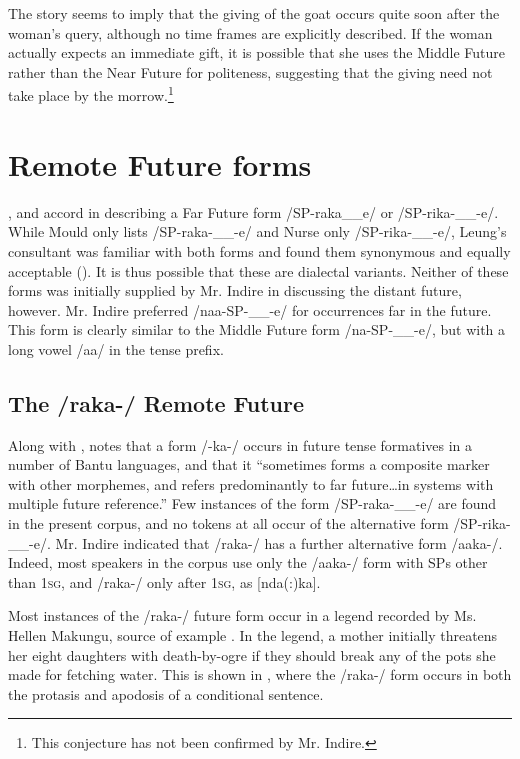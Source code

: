 \documentclass[output=paper]{langsci/langscibook}
\begin{document}
The story seems to imply that the giving of the goat occurs quite soon after the woman’s query, although no time frames are explicitly described. If the woman actually expects an immediate gift, it is possible that she uses the Middle Future rather than the Near Future for politeness, suggesting that the giving need not take place by the morrow.\footnote{ This conjecture has not been confirmed by Mr. Indire.}

\section[Remote Future forms]{Remote Future forms} \label{sec:sarvasy:6}
\citet{Mould1981}, \citet{Leung1991} and \citet{Nurse2003} accord in describing a Far Future %
%
form /SP-raka\_\_e/ or /SP-rika-\_\_-e/. While Mould only lists /SP-raka-\_\_-e/ and Nurse only /SP-rika-\_\_-e/, Leung’s consultant was familiar with both forms and found them synonymous and equally acceptable (\citeyear[204, fn 10]{Leung1991}). It is thus possible that these are dialectal variants. Neither of these forms was initially supplied by Mr. Indire in discussing the distant future, however. Mr. Indire preferred /naa-SP-\_\_-e/ for occurrences far in the future. This form is clearly similar to the Middle Future form /na-SP-\_\_-e/, but with a long vowel /aa/ in the tense prefix. 

\subsection{The /raka-/ Remote Future}\label{sec:sarvasy:6.1}

Along with \citet{Botne1999}, \citet[85]{Nurse2008} notes that a form /-ka-/ occurs in future tense formatives in a number of Bantu languages, and that it “sometimes forms a composite marker with other morphemes, and refers predominantly to far future\ldots in systems with multiple future reference.” Few instances of the form /SP-raka-\_\_-e/ are found in the present corpus, and no tokens at all occur of the alternative form /SP-rika-\_\_-e/. Mr. Indire indicated that /raka-/ has a further alternative form /aaka-/. Indeed, most speakers in the corpus use only the /aaka-/ form with SPs other than \textsc{1sg}, and /raka-/ only after \textsc{1sg}, as [nda(:)ka].

Most instances of the /raka-/ future form occur in a legend recorded by Ms. Hellen Makungu, source of example . In the legend, a mother initially threatens her eight daughters with death-by-ogre if they should break any of the pots she made for fetching water. This is shown in , where the /raka-/ form occurs in both the protasis and apodosis of a conditional sentence. 
\end{document}
